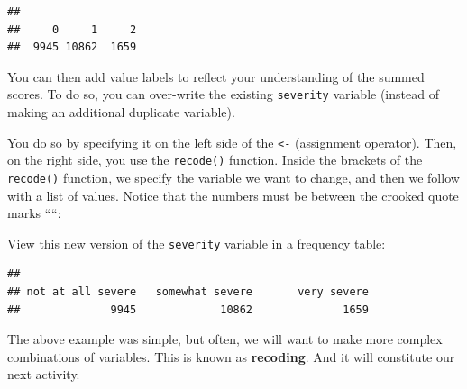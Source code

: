 \documentclass[
]{book}
\newenvironment{Shaded}{\begin{snugshade}}{\end{snugshade}}
\newcommand{\AttributeTok}[1]{\textcolor[rgb]{0.77,0.63,0.00}{#1}}
\newcommand{\FunctionTok}[1]{\textcolor[rgb]{0.00,0.00,0.00}{#1}}
\newcommand{\NormalTok}[1]{#1}
\newcommand{\OtherTok}[1]{\textcolor[rgb]{0.56,0.35,0.01}{#1}}
\newcommand{\SpecialCharTok}[1]{\textcolor[rgb]{0.00,0.00,0.00}{#1}}
\newcommand{\StringTok}[1]{\textcolor[rgb]{0.31,0.60,0.02}{#1}}
\begin{document}
\begin{verbatim}
## 
##     0     1     2 
##  9945 10862  1659
\end{verbatim}

You can then add value labels to reflect your understanding of the summed scores. To do so, you can over-write the existing \texttt{severity} variable (instead of making an additional duplicate variable).

You do so by specifying it on the left side of the \texttt{\textless{}-} (assignment operator). Then, on the right side, you use the \texttt{recode()} function. Inside the brackets of the \texttt{recode()} function, we specify the variable we want to change, and then we follow with a list of values. Notice that the numbers must be between the crooked quote marks ````:

\begin{Shaded}
\end{Shaded}

View this new version of the \texttt{severity} variable in a frequency table:

\begin{Shaded}
\end{Shaded}

\begin{verbatim}
## 
## not at all severe   somewhat severe       very severe 
##              9945             10862              1659
\end{verbatim}

The above example was simple, but often, we will want to make more complex combinations of variables. This is known as \textbf{recoding}. And it will constitute our next activity.
\end{document}
